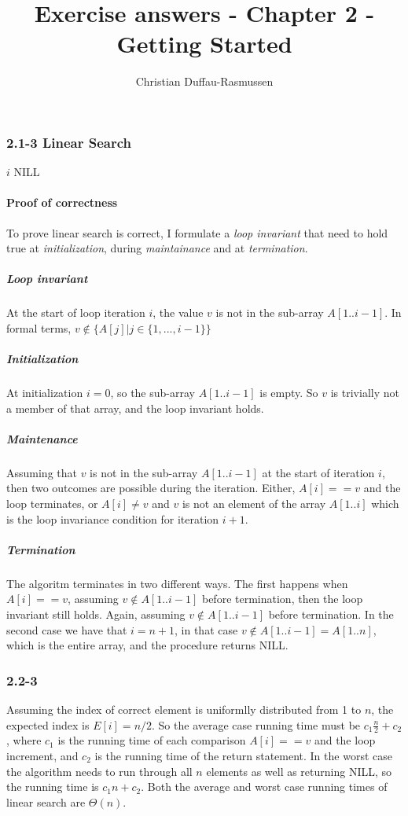 \documentclass{article}
\title{Exercise answers - Chapter 2 - Getting Started}
\author{Christian Duffau-Rasmussen}
\let\oldReturn\Return
\renewcommand{\Return}{\State\oldReturn}
\begin{document}
\subsubsection*{2.1-3 Linear Search}

\begin{algorithmic}[1]
\Return $i$
\EndIf
\EndFor
\Return NILL
\EndProcedure
\end{algorithmic}

\paragraph{Proof of correctness}

To prove linear search is correct, I formulate a \emph{loop invariant} that need to hold true at \emph{initialization}, during \emph{maintainance} and at \emph{termination}.

\subparagraph{Loop invariant} At the start of loop iteration $i$, the value $v$ is not in the sub-array $A[1..i-1]$. In formal terms, $v \notin \{ A[j] \vert j\in\{1,...,i-1\} \}$

\subparagraph{Initialization} At initialization $i=0$, so the sub-array $A[1..i-1]$ is empty. So $v$ is trivially not a member of that array, and the loop invariant holds.

\subparagraph{Maintenance} Assuming that $v$ is not in the sub-array $A[1..i-1]$ at the start of iteration $i$, then two outcomes are possible during the iteration. Either, $A[i] == v$ and the loop terminates, or $A[i]\neq v$ and $v$ is not an element of the array $A[1..i]$ which is the loop invariance condition for iteration $i+1$.

\subparagraph{Termination} The algoritm terminates in two different ways. The first happens when $A[i] == v$, assuming $v \notin A[1..i-1]$ before termination, then the loop invariant still holds. Again, assuming $v \notin A[1..i-1]$ before termination. In the second case we have that $i=n+1$, in that case $v \notin A[1..i-1]=A[1..n]$, which is the entire array, and the procedure returns NILL.

\subsubsection*{2.2-3}
Assuming the index of correct element is uniformlly distributed from 1 to $n$, the expected index is $E[i] = n/2$. So the average case running time must be $c_1\frac{n}{2} + c_2$, where $c_1$ is the running time of each comparison $A[i]==v$ and the loop increment,  and $c_2$ is the running time of the return statement. In the worst case the algorithm needs to run through all $n$ elements as well as returning NILL, so the running time is $c_1n + c_2$.  
Both the average and worst case running times of linear search are $\Theta(n)$.
\end{document}
